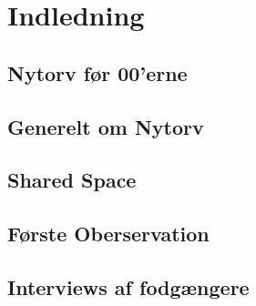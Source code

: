\chapter{Indledning}
\label{chap:Indledning}

\section{Nytorv før 00'erne}
\label{sec:Nytorv før 00'erne}

\section{Generelt om Nytorv}
\label{sec:Generelt om Nytorv}

\section{Shared Space}
\label{sec:Shared Space}

\section{Første Oberservation}
\label{sec:Første Oberservation}

\section{Interviews af fodgængere}
\label{sec:Interviews af fodgængere}
